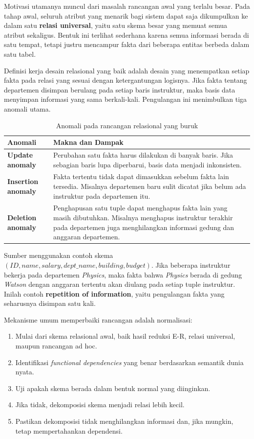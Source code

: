 Motivasi utamanya muncul dari masalah rancangan awal yang terlalu besar. Pada tahap awal, seluruh atribut yang menarik bagi sistem dapat saja dikumpulkan ke dalam satu \textbf{relasi universal}, yaitu satu skema besar yang memuat semua atribut sekaligus. Bentuk ini terlihat sederhana karena semua informasi berada di satu tempat, tetapi justru mencampur fakta dari beberapa entitas berbeda dalam satu tabel.

Definisi kerja desain relasional yang baik adalah desain yang menempatkan setiap fakta pada relasi yang sesuai dengan ketergantungan logisnya. Jika fakta tentang departemen disimpan berulang pada setiap baris instruktur, maka basis data menyimpan informasi yang sama berkali-kali. Pengulangan ini menimbulkan tiga anomali utama.

\begin{table}[H]
\centering
\begin{tabularx}{\textwidth}{|L{0.28\textwidth}|X|}
\hline
\textbf{Anomali} & \textbf{Makna dan Dampak} \\
\hline
\textbf{Update anomaly} & Perubahan satu fakta harus dilakukan di banyak baris. Jika sebagian baris lupa diperbarui, basis data menjadi inkonsisten. \\
\hline
\textbf{Insertion anomaly} & Fakta tertentu tidak dapat dimasukkan sebelum fakta lain tersedia. Misalnya departemen baru sulit dicatat jika belum ada instruktur pada departemen itu. \\
\hline
\textbf{Deletion anomaly} & Penghapusan satu tuple dapat menghapus fakta lain yang masih dibutuhkan. Misalnya menghapus instruktur terakhir pada departemen juga menghilangkan informasi gedung dan anggaran departemen. \\
\hline
\end{tabularx}
\caption{Anomali pada rancangan relasional yang buruk}
\label{tab:anomali-relasional}
\end{table}

Sumber menggunakan contoh skema \((ID, name, salary, dept\_name, building, budget)\). Jika beberapa instruktur bekerja pada departemen \textit{Physics}, maka fakta bahwa \textit{Physics} berada di gedung \textit{Watson} dengan anggaran tertentu akan diulang pada setiap tuple instruktur. Inilah contoh \textbf{repetition of information}, yaitu pengulangan fakta yang seharusnya disimpan satu kali.

Mekanisme umum memperbaiki rancangan adalah normalisasi:
\begin{enumerate}
    \item Mulai dari skema relasional awal, baik hasil reduksi E-R, relasi universal, maupun rancangan ad hoc.
    \item Identifikasi \textit{functional dependencies} yang benar berdasarkan semantik dunia nyata.
    \item Uji apakah skema berada dalam bentuk normal yang diinginkan.
    \item Jika tidak, dekomposisi skema menjadi relasi lebih kecil.
    \item Pastikan dekomposisi tidak menghilangkan informasi dan, jika mungkin, tetap mempertahankan dependensi.
\end{enumerate}


